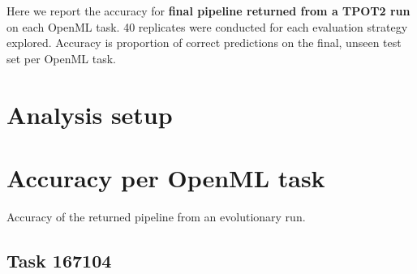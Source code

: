\documentclass[
]{book}
\newenvironment{Shaded}{\begin{snugshade}}{\end{snugshade}}
\newcommand{\AttributeTok}[1]{\textcolor[rgb]{0.13,0.29,0.53}{#1}}
\newcommand{\ConstantTok}[1]{\textcolor[rgb]{0.56,0.35,0.01}{#1}}
\newcommand{\FunctionTok}[1]{\textcolor[rgb]{0.13,0.29,0.53}{\textbf{#1}}}
\newcommand{\NormalTok}[1]{#1}
\newcommand{\OtherTok}[1]{\textcolor[rgb]{0.56,0.35,0.01}{#1}}
\newcommand{\SpecialCharTok}[1]{\textcolor[rgb]{0.81,0.36,0.00}{\textbf{#1}}}
\newcommand{\StringTok}[1]{\textcolor[rgb]{0.31,0.60,0.02}{#1}}
\begin{document}
Here we report the accuracy for \textbf{final pipeline returned from a TPOT2 run} on each OpenML task.
40 replicates were conducted for each evaluation strategy explored.
Accuracy is proportion of correct predictions on the final, unseen test set per OpenML task.

\hypertarget{analysis-setup}{%
\section{Analysis setup}\label{analysis-setup}}

\begin{Shaded}
\end{Shaded}

\hypertarget{accuracy-per-openml-task}{%
\section{Accuracy per OpenML task}\label{accuracy-per-openml-task}}

Accuracy of the returned pipeline from an evolutionary run.

\hypertarget{task-167104}{%
\subsection{Task 167104}\label{task-167104}}
\end{document}

